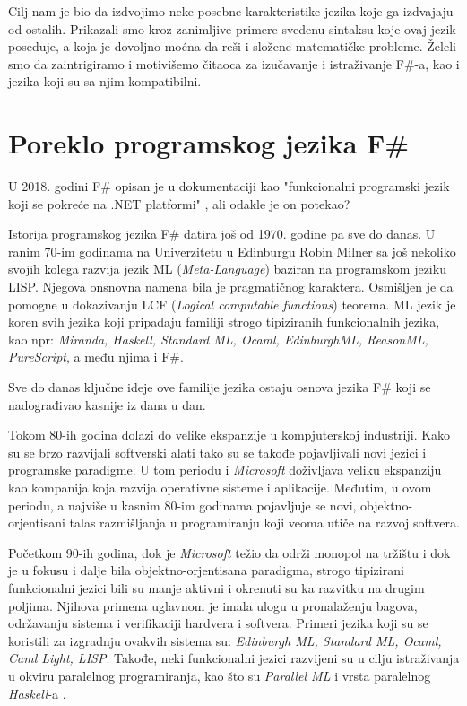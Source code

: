 \documentclass[a4paper]{article}
\begin{document}
Cilj nam je bio da izdvojimo neke posebne karakteristike jezika koje ga izdvajaju od ostalih. Prikazali smo kroz zanimljive primere svedenu sintaksu koje ovaj jezik poseduje, a koja je dovoljno moćna da reši i složene matematičke probleme. Želeli smo da zaintrigiramo i motivišemo čitaoca za izučavanje i istraživanje F\#-a, kao i jezika koji su sa njim kompatibilni.

\section{Poreklo programskog jezika F\#}
\label{sec:poreklo}

U 2018. godini F\# opisan je u dokumentaciji kao "funkcionalni programski jezik koji se pokreće na .NET platformi" \cite{early_history}, ali odakle je on potekao?

Istorija programskog jezika F\# datira još od 1970. godine pa sve do danas. U ranim 70-im godinama na Univerzitetu u Edinburgu Robin Milner sa još nekoliko svojih kolega razvija jezik ML ({\em Meta-Language}) baziran na programskom jeziku LISP. Njegova onsnovna namena bila je pragmatičnog karaktera. Osmišljen je da pomogne u dokazivanju LCF ({\em Logical computable functions}) \cite{Milner:1972:LCF:891954} teorema. ML jezik je koren svih jezika koji pripadaju familiji strogo tipiziranih funkcionalnih jezika, kao npr: {\em Miranda, Haskell, Standard ML, Ocaml, EdinburghML, ReasonML, PureScript}, a među njima i F\#.

Sve do danas ključne ideje ove familije jezika ostaju osnova jezika F\# koji se nadograđivao kasnije iz dana u dan. 

Tokom 80-ih godina dolazi do velike ekspanzije u kompjuterskoj industriji. Kako su se brzo razvijali softverski alati tako su se takođe pojavljivali novi jezici i programske paradigme. U tom periodu i {\em Microsoft} doživljava veliku ekspanziju kao kompanija koja razvija operativne sisteme i aplikacije. Međutim, u ovom periodu, a najviše u kasnim 80-im godinama pojavljuje se novi, objektno-orjentisani talas razmišljanja u programiranju koji veoma utiče na razvoj softvera.

Početkom 90-ih godina, dok je {\em Microsoft} težio da održi monopol na tržištu i dok je u fokusu i dalje bila objektno-orjentisana paradigma, strogo tipizirani funkcionalni jezici bili su manje aktivni i okrenuti su ka razvitku na drugim poljima. Njihova primena uglavnom je imala ulogu u pronalaženju bagova, održavanju sistema i verifikaciji hardvera i softvera. Primeri jezika koji su se koristili za izgradnju ovakvih sistema su: {\em Edinburgh ML, Standard ML, Ocaml, Caml Light, LISP}. Takođe, neki funkcionalni jezici razvijeni su u cilju istraživanja u okviru paralelnog programiranja, kao što su {\em Parallel ML} i vrsta paralelnog {\em Haskell}-a \cite{early_history}. 
\end{document}
